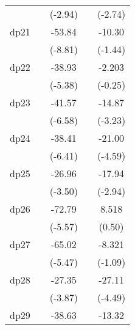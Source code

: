 {\begin{tabular}{l*{4}{c}}
            &                     &     (-2.94)         &                     &     (-2.74)         \\
[1em]
dp21        &                     &      -53.84\sym{***}&                     &      -10.30         \\
            &                     &     (-8.81)         &                     &     (-1.44)         \\
[1em]
dp22        &                     &      -38.93\sym{***}&                     &      -2.203         \\
            &                     &     (-5.38)         &                     &     (-0.25)         \\
[1em]
dp23        &                     &      -41.57\sym{***}&                     &      -14.87\sym{**} \\
            &                     &     (-6.58)         &                     &     (-3.23)         \\
[1em]
dp24        &                     &      -38.41\sym{***}&                     &      -21.00\sym{***}\\
            &                     &     (-6.41)         &                     &     (-4.59)         \\
[1em]
dp25        &                     &      -26.96\sym{***}&                     &      -17.94\sym{**} \\
            &                     &     (-3.50)         &                     &     (-2.94)         \\
[1em]
dp26        &                     &      -72.79\sym{***}&                     &       8.518         \\
            &                     &     (-5.57)         &                     &      (0.50)         \\
[1em]
dp27        &                     &      -65.02\sym{***}&                     &      -8.321         \\
            &                     &     (-5.47)         &                     &     (-1.09)         \\
[1em]
dp28        &                     &      -27.35\sym{***}&                     &      -27.11\sym{***}\\
            &                     &     (-3.87)         &                     &     (-4.49)         \\
[1em]
dp29        &                     &      -38.63\sym{***}&                     &      -13.32\sym{**} \\

\end{tabular}}
